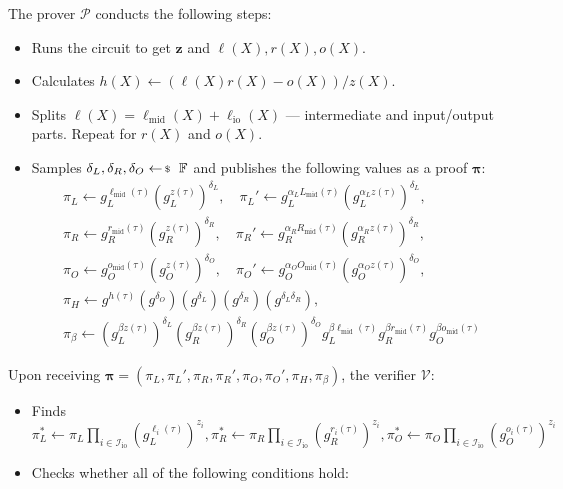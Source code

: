 \documentclass[../lecture-notes-148x210.tex]{subfiles}
\begin{document}
\begin{tcolorbox}
    The prover $\mathcal{P}$ conducts the following steps:
    \begin{itemize}[label=]
        \item Runs the circuit to get $\mathbf{z}$ and $\ell(X),r(X),o(X)$.
        \item Calculates $h(X) \gets (\ell(X)r(X) - o(X))\big/ z(X)$.
        \item Splits $\ell(X) = \ell_{\text{mid}}(X) + \ell_{\text{io}}(X)$ --- intermediate and input/output parts. Repeat for $r(X)$ and $o(X)$.
        \item Samples $\delta_L, \delta_R, \delta_O \leftarrowS \mathbb{F}$ and publishes the following values as a proof $\boldsymbol{\pi}$: 
        \begin{align*}
            \pi_L \gets g_L^{\ell_{\text{mid}}(\tau)}\left(g_L^{z(\tau)}\right)^{\delta_L}, \quad \pi_L' \gets g_L^{\alpha_LL_{\text{mid}}(\tau)}\left(g_L^{\alpha_L z(\tau)}\right)^{\delta_L}, \\
            \pi_R \gets g_R^{r_{\text{mid}}(\tau)}\left(g_R^{z(\tau)}\right)^{\delta_R}, \quad \pi_R' \gets g_R^{\alpha_RR_{\text{mid}}(\tau)}\left(g_R^{\alpha_R z(\tau)}\right)^{\delta_R}, \\
            \pi_O \gets g_O^{o_{\text{mid}}(\tau)}\left(g_O^{z(\tau)}\right)^{\delta_O}, \quad \pi_O' \gets g_O^{\alpha_OO_{\text{mid}}(\tau)}\left(g_O^{\alpha_O z(\tau)}\right)^{\delta_O}, \\
            \pi_H \gets g^{h(\tau)}(g^{\delta_O})(g^{\delta_L})(g^{\delta_R})(g^{\delta_L\delta_R}), \\ 
            \pi_{\beta} \gets \left(g_L^{\beta z(\tau)}\right)^{\delta_L}\left(g_R^{\beta z(\tau)}\right)^{\delta_R}\left(g_O^{\beta z(\tau)}\right)^{\delta_O}g_L^{\beta \ell_{\text{mid}}(\tau)}g_R^{\beta r_{\text{mid}}(\tau)}g_O^{\beta o_{\text{mid}}(\tau)}
        \end{align*}
    \end{itemize}

    Upon receiving $\boldsymbol{\pi} = (\pi_L,\pi_L',\pi_R,\pi_R',\pi_O,\pi_O',\pi_H,\pi_{\beta})$, the verifier $\mathcal{V}$:
    \begin{itemize}[label=]
        \item Finds $\pi_L^* \gets \pi_L\prod_{i \in \mathcal{I}_{\text{io}}} (g_L^{\ell_i(\tau)})^{z_i},\pi_R^* \gets \pi_R\prod_{i \in \mathcal{I}_{\text{io}}} (g_R^{r_i(\tau)})^{z_i},\pi_O^* \gets \pi_O\prod_{i \in \mathcal{I}_{\text{io}}} (g_O^{o_i(\tau)})^{z_i}$
        \item Checks whether all of the following conditions hold:
        

\end{itemize}
\end{tcolorbox}
\end{document}
